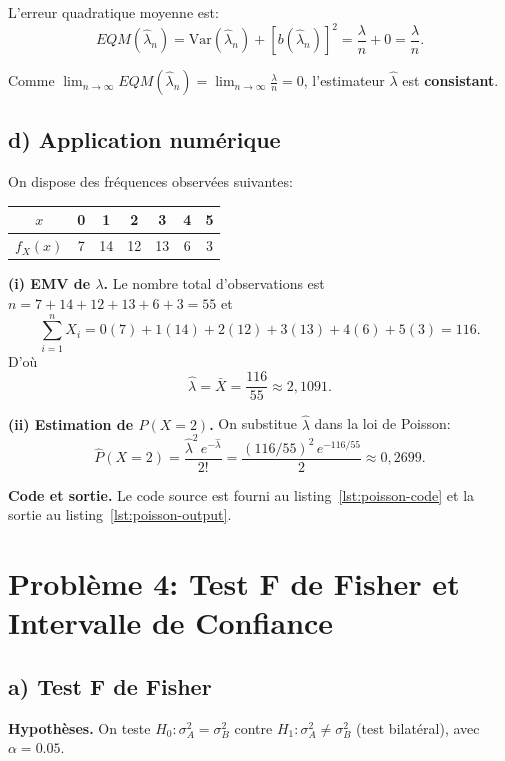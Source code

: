 \documentclass[12pt,letterpaper]{article}
\begin{document}
L'erreur quadratique moyenne est:
\[
EQM(\hat{\lambda}_n) = \text{Var}(\hat{\lambda}_n) + [b(\hat{\lambda}_n)]^2 = \frac{\lambda}{n} + 0 = \frac{\lambda}{n}. %
\]

Comme $\displaystyle \lim_{n \to \infty} EQM(\hat{\lambda}_n) = \lim_{n \to \infty} \frac{\lambda}{n} = 0$,
l'estimateur $\hat{\lambda}$ est \textbf{consistant}.

\subsection{d) Application numérique} %

On dispose des fréquences observées suivantes:

\begin{center}
\begin{tabular}{c|cccccc} %
$x$ & 0 & 1 & 2 & 3 & 4 & 5 \\ \hline %
$f_X(x)$ & 7 & 14 & 12 & 13 & 6 & 3
\end{tabular}
\end{center}

\textbf{(i) EMV de $\lambda$.}
Le nombre total d'observations est $n = 7+14+12+13+6+3 = 55$ et
\[
\sum_{i=1}^n X_i = 0(7) + 1(14) + 2(12) + 3(13) + 4(6) + 5(3) = 116.
\]
D'où
\[
\hat{\lambda} = \bar{X} = \frac{116}{55} \approx 2{,}1091.
\]

\textbf{(ii) Estimation de $P(X = 2)$.}
On substitue $\hat{\lambda}$ dans la loi de Poisson:
\[
\hat{P}(X = 2) = \frac{\hat{\lambda}^2\, e^{-\hat{\lambda}}}{2!}
= \frac{(116/55)^2\, e^{-116/55}}{2} %
\approx 0{,}2699.
\]

\textbf{Code et sortie.} Le code source est fourni au listing~\ref{lst:poisson-code} et la sortie au listing~\ref{lst:poisson-output}.





\section{Problème 4: Test F de Fisher et Intervalle de Confiance}

\subsection{a) Test F de Fisher} %
\textbf{Hypothèses.} On teste
\(H_0: \sigma_A^2 = \sigma_B^2\) contre \(H_1: \sigma_A^2 \neq \sigma_B^2\) (test bilatéral), avec \(\alpha = 0.05\).
\end{document}
